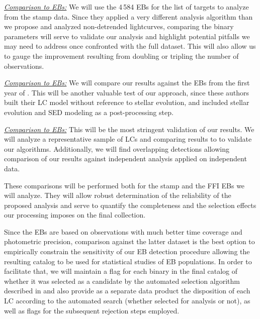 \textit{\underline{Comparison to \citep{Prsa_et_al_22} \tess{} EBs:}} We will
use the 4\,584 \citep{Prsa_et_al_22} EBs for the list of targets to analyze from
the \tess{} stamp data. Since they applied a very different analysis algorithm
than we propose and analyzed non-detrended lightcurves, comparing the binary
parameters will serve to validate our analysis and highlight potential pitfalls
we may need to address once confronted with the full dataset. This will also
allow us to gauge the improvement resulting from doubling or tripling the number
of observations.

\textit{\underline{Comparison to \citep{Justesen_Albrecht_21} \tess{} EBs:}} We
will compare our results against the \citep{Justesen_Albrecht_21} EBs from the
first year of \tess{}. This will be another valuable test of our approach, since
these authors built their LC model without reference to stellar evolution, and
included stellar evolution and SED modeling as a post-processing step.

\textit{\underline{Comparison to \citep{Windemuth_et_al_19} \kepler{} EBs:}}
This will be the most stringent validation of our results. We will analyze a
representative sample of \kepler{} LCs and comparing results to
\citep{Windemuth_et_al_19} to validate our algorithms. Additionally, we will
find overlapping detections allowing comparison of our results against
independent analysis applied on independent data.

These comparisons will be performed both for the stamp and the FFI EBs we will
analyze. They will allow robust determination of the reliability of the proposed
analysis and serve to quantify the completeness and the selection effects our
processing imposes on the final collection.

Since the \citep{Windemuth_et_al_19} \kepler{} EBs are based on observations
with much better time coverage and photometric precision, comparison against the
latter dataset is the best option to empirically constrain the sensitivity of
our EB detection procedure allowing the resulting catalog to be used for
statistical studies of EB populations. In order to facilitate that, we will
maintain a flag for each binary in the final catalog of whether it was selected
as a candidate by the automated selection algorithm described in
 and also provide as a separate data product the
disposition of each LC according to the automated search (whether selected for
analysis or not), as well as flags for the subsequent rejection steps employed.


